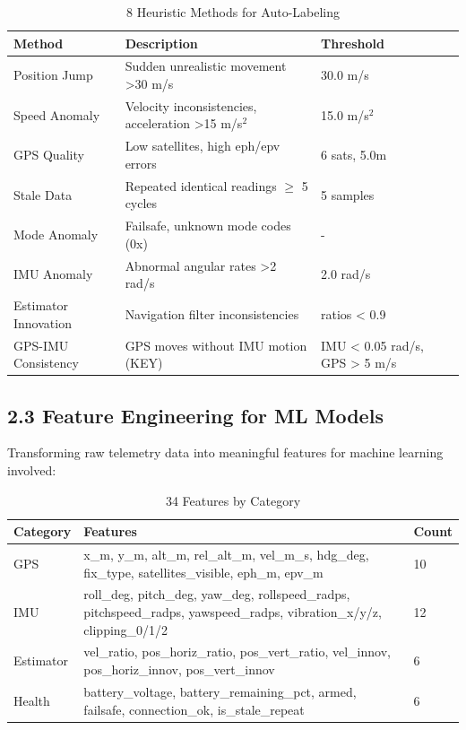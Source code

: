 \begin{table}[htbp]
    \centering
    \caption{8 Heuristic Methods for Auto-Labeling}
    \label{tab:auto_label}
    \begin{tabular}{|l|p{5cm}|p{3cm}|}
        \hline
        \textbf{Method} & \textbf{Description} & \textbf{Threshold} \\
        \hline
        Position Jump & Sudden unrealistic movement >30 m/s & 30.0 m/s \\
        \hline
        Speed Anomaly & Velocity inconsistencies, acceleration >15 m/s$^2$ & 15.0 m/s$^2$ \\
        \hline
        GPS Quality & Low satellites, high eph/epv errors & 6 sats, 5.0m \\
        \hline
        Stale Data & Repeated identical readings $\ge$ 5 cycles & 5 samples \\
        \hline
        Mode Anomaly & Failsafe, unknown mode codes (0x) & - \\
        \hline
        IMU Anomaly & Abnormal angular rates >2 rad/s & 2.0 rad/s \\
        \hline
        Estimator Innovation & Navigation filter inconsistencies & ratios < 0.9 \\
        \hline
        GPS-IMU Consistency & GPS moves without IMU motion (KEY) & IMU < 0.05 rad/s, GPS > 5 m/s \\
        \hline
    \end{tabular}
\end{table}

\subsection{2.3 Feature Engineering for ML Models}

Transforming raw telemetry data into meaningful features for machine learning involved:

\begin{table}[htbp]
    \centering
    \caption{34 Features by Category}
    \label{tab:features}
    \begin{tabular}{|l|p{6cm}|l|}
        \hline
        \textbf{Category} & \textbf{Features} & \textbf{Count} \\
        \hline
        GPS & x\_m, y\_m, alt\_m, rel\_alt\_m, vel\_m\_s, hdg\_deg, fix\_type, satellites\_visible, eph\_m, epv\_m & 10 \\
        \hline
        IMU & roll\_deg, pitch\_deg, yaw\_deg, rollspeed\_radps, pitchspeed\_radps, yawspeed\_radps, vibration\_x/y/z, clipping\_0/1/2 & 12 \\
        \hline
        Estimator & vel\_ratio, pos\_horiz\_ratio, pos\_vert\_ratio, vel\_innov, pos\_horiz\_innov, pos\_vert\_innov & 6 \\
        \hline
        Health & battery\_voltage, battery\_remaining\_pct, armed, failsafe, connection\_ok, is\_stale\_repeat & 6 \\
        \hline
    \end{tabular}
\end{table}

